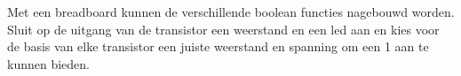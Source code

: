 Met een breadboard kunnen de verschillende boolean functies nagebouwd worden. Sluit op de uitgang van de transistor een weerstand en een led aan en kies voor de basis van elke transistor een juiste weerstand en spanning om een 1 aan te kunnen bieden.

